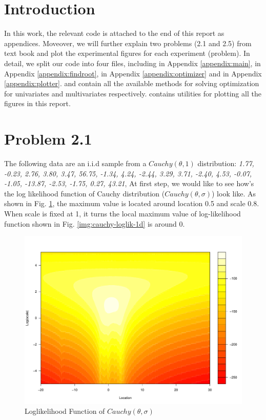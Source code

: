 \section{Introduction}
In this work, the relevant code is attached to the end of this report as appendices. Moveover, we will further explain two problems (2.1 and 2.5) from text book and plot the experimental figures for each experiment (problem). In detail, we split our code into four files, including  in Appendix \ref{appendix:main},  in Appendix \ref{appendix:findroot},  in Appendix \ref{appendix:optimizer} and  in Appendix \ref{appendix:plotter}.  and  contain all the available methods for solving optimization for univariates and multivariates respectively.  contains utilities for plotting all the figures in this report. 

\section{Problem 2.1}
The following data are an i.i.d sample from a $Cauchy(\theta, 1)$ distribution: \textit{1.77, -0.23, 2.76, 3.80, 3.47, 56.75, -1.34, 4.24, -2.44, 3.29, 3.71, -2.40, 4.53, -0.07, -1.05, -13.87, -2.53, -1.75, 0.27, 43.21}, At first step, we would like to see how's the log likelihood function of Cauchy distribution ($Cauchy(\theta, \sigma)$) look like. As shown in Fig. \ref{img:cauchy-loglik-2d}, the maximum value is located around location 0.5 and scale 0.8. When scale is fixed at 1, it turns the local maximum value of log-likelihood function shown in Fig. \ref{img:cauchy-loglik-1d} is around 0. 

\begin{figure}[h!]
\includegraphics[scale=0.3]{figs/cauchy-loglik-2d.pdf}
\caption{Loglikelihood Function of $Cauchy(\theta, \sigma)$}
\label{img:cauchy-loglik-2d}
\end{figure}


